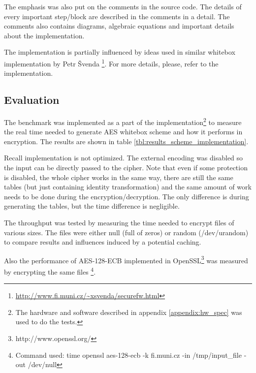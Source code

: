 \documentclass[11pt,oneside,final]{fithesis2}
\begin{document}
    The emphasis was also put on the comments in the source code. The details of every important step/block are described 
    in the comments in a detail. The comments also contains diagrams, algebraic equations and important details about the implementation.

    The implementation is partially influenced by ideas used in similar whitebox implementation by Petr \v{S}venda \footnote{\url{http://www.fi.muni.cz/~xsvenda/securefw.html}}. 
    For more details, please, refer to the implementation.
    
    \subsection{Evaluation}
    The benchmark was implemented as a part of the implementation\footnote{The hardware and software described in appendix \ref{appendix:hw_spec} was used to do the tests. } to measure
    the real time needed to generate AES whitebox scheme and how it performs in encryption. The results are shown in table \ref{tbl:results_scheme_implementation}.
    
    Recall implementation is not optimized. The external encoding was disabled so the input can be directly passed to the 
    cipher. Note that even if some protection is disabled, the whole cipher works in the same way, there are still the same
    tables (but just containing identity transformation) and the same amount of work needs to be done during the encryption/decryption. 
    The only difference is during generating the tables, but the time difference is negligible.

    The throughput was tested by measuring the time needed to encrypt files of various sizes. The files were either null (full of zeros) or random (/dev/urandom)
    to compare results and influences induced by a potential caching.
    
    Also the performance of AES-128-ECB implemented in OpenSSL\footnote{http://www.openssl.org/} was measured by encrypting the same 
    files \footnote{Command used: time openssl aes-128-ecb -k fi.muni.cz  -in /tmp/input\_file -out /dev/null }.
    
\end{document}
